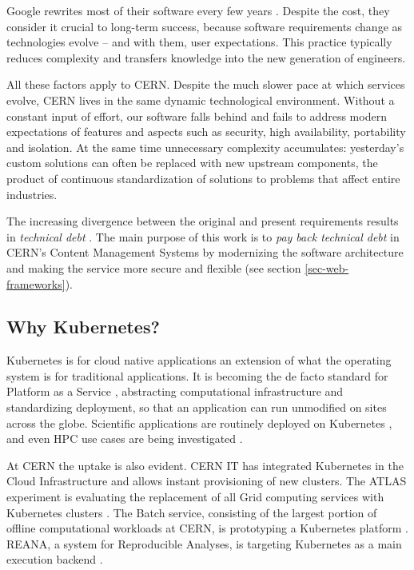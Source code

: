 Google rewrites most of their software every few years \cite{hendersonSoftwareEngineeringGoogle2020a}.
Despite the cost, they consider it crucial to long-term success,
because software requirements change as technologies evolve -- and with them, user expectations.
This practice typically reduces complexity and transfers knowledge into the new generation of engineers.

All these factors apply to CERN.
Despite the much slower pace at which services evolve, CERN lives in the same dynamic technological environment.
Without a constant input of effort, our software falls behind and fails to address modern expectations
of features and aspects such as security, high availability, portability and isolation.
At the same time unnecessary complexity accumulates:
yesterday's custom solutions can often be replaced with new upstream components,
the product of continuous standardization of solutions to problems that affect entire industries.

The increasing divergence between the original and present requirements results in \emph{technical debt} \cite{fairbanksUrTechnicalDebt2020a}.
The main purpose of this work is to \emph{pay back technical debt} in CERN's Content Management Systems by modernizing the software architecture
and making the service more secure and flexible (see section \ref{sec-web-frameworks}).


\subsection{Why Kubernetes?}

Kubernetes is for cloud native applications an extension of what the operating system is for traditional applications.
It is becoming the de facto standard for Platform as a Service \cite{kavianiServerlessCommodityCase2019a}, abstracting computational infrastructure and standardizing deployment,
so that an application can run unmodified on sites across the globe.
Scientific applications are routinely deployed on Kubernetes \cite{banekWhyLSSTScience2019, haririBatchOnlineAnomaly2018a, yuanBioinformaticsApplicationKubeflow2020a},
and even HPC use cases are being investigated \cite{beltreEnablingHPCWorkloads2019}.

At CERN the uptake is also evident.
CERN IT has integrated Kubernetes in the Cloud Infrastructure and allows instant provisioning of new clusters.
The ATLAS experiment is evaluating the replacement of all Grid computing services with Kubernetes clusters \cite{meginoUsingKubernetesATLAS2020a}.
The Batch service, consisting of the largest portion of offline computational workloads at CERN, is prototyping a Kubernetes platform \cite{alvarezManagingCERNBatch2020a}.
REANA, a system for Reproducible Analyses, is targeting Kubernetes as a main execution backend \cite{simkoREANASystemReusable2019a}.

